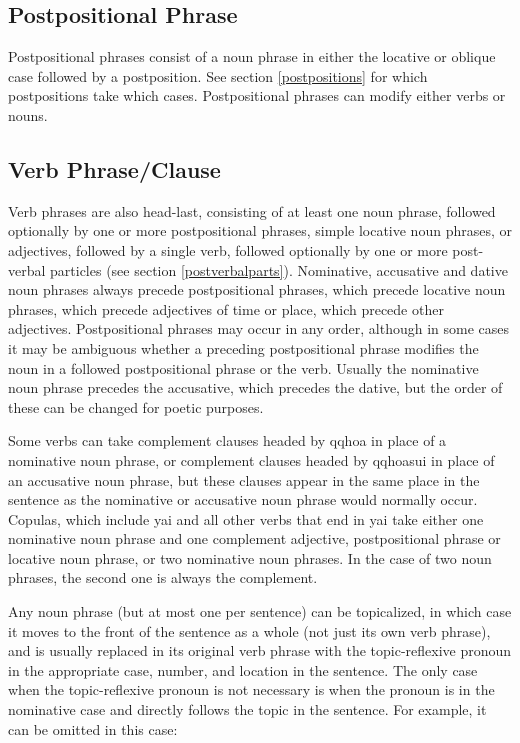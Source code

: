 \documentclass{article}
\begin{document}
\subsection{Postpositional Phrase}

Postpositional phrases consist of a noun phrase in either the locative or oblique case followed by a postposition. See section \ref{postpositions} for which postpositions take which cases. Postpositional phrases can modify either verbs or nouns.

\subsection{Verb Phrase/Clause}
\label{verbphrase}

Verb phrases are also head-last, consisting of at least one noun phrase, followed optionally by one or more postpositional phrases, simple locative noun phrases, or adjectives, followed by a single verb, followed optionally by one or more post-verbal particles (see section \ref{postverbalparts}). Nominative, accusative and dative noun phrases always precede postpositional phrases, which precede locative noun phrases, which precede adjectives of time or place, which precede other adjectives. Postpositional phrases may occur in any order, although in some cases it may be ambiguous whether a preceding postpositional phrase modifies the noun in a followed postpositional phrase or the verb.  Usually the nominative noun phrase precedes the accusative, which precedes the dative, but the order of these can be changed for poetic purposes.

Some verbs can take complement clauses headed by {\quch qqhoa} in place of a nominative noun phrase, or complement clauses headed by {\quch qqhoasui} in place of an accusative noun phrase, but these clauses appear in the same place in the sentence as the nominative or accusative noun phrase would normally occur. Copulas, which include {\quch yai} and all other verbs that end in {\quch yai} take either one nominative noun phrase and one complement adjective, postpositional phrase or locative noun phrase, or two nominative noun phrases. In the case of two noun phrases, the second one is always the complement.

Any noun phrase (but at most one per sentence) can be topicalized, in which case it moves to the front of the sentence as a whole (not just its own verb phrase), and is usually replaced in its original verb phrase with the topic-reflexive pronoun in the appropriate case, number, and location in the sentence. The only case when the topic-reflexive pronoun is not necessary is when the pronoun is in the nominative case and directly follows the topic in the sentence. For example, it can be omitted in this case:
\end{document}
